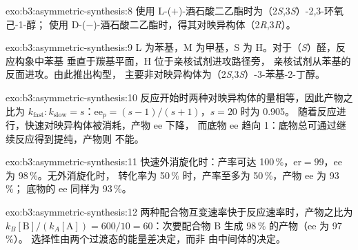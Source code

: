 \begin{solution}{exo:b3:asymmetric-synthesis:8}
使用 L-($+$)-酒石酸二乙酯时为（2\textit{S},3\textit{S}）-2,3-环氧己-1-醇；
使用 D-($-$)-酒石酸二乙酯时，得其对映异构体（2\textit{R},3\textit{R}）。
\end{solution}

\begin{solution}{exo:b3:asymmetric-synthesis:9}
L 为苯基，M 为甲基，S 为 H。对于（\textit{S}）醛，反应构象中苯基
垂直于羰基平面，H 位于亲核试剂进攻路径旁，
亲核试剂从苯基的反面进攻。由此推出构型，
主要非对映异构体为（2\textit{S},3\textit{S}）-3-苯基-2-丁醇。
\end{solution}

\begin{solution}{exo:b3:asymmetric-synthesis:10}
反应开始时两种对映异构体的量相等，因此产物之比为
$k_{\mathrm{fast}} : k_{\mathrm{slow}} = s$：$\mathrm{ee}_p = (s - 1)/(s + 1)$，$s = 20$ 时为 0.905。
随着反应进行，快速对映异构体被消耗，产物 ee 下降，
而底物 ee 趋向 1：底物总可通过继续反应得到提纯，产物则
不能。
\end{solution}

\begin{solution}{exo:b3:asymmetric-synthesis:11}
快速外消旋化时：产率可达 100\,\%，$\mathrm{er} = 99$，ee 为 98\,\%。无外消旋化时，
转化率为 50\,\% 时，产率至多为 50\,\%，产物 ee 为 93\,\%；
底物的 ee 同样为 93\,\%。
\end{solution}

\begin{solution}{exo:b3:asymmetric-synthesis:12}
两种配合物互变速率快于反应速率时，产物之比为
$k_B[\mathrm B]/(k_A[\mathrm A]) = 600/10 = 60$：次要配合物 B 生成 98\,\% 的产物（ee 为 97\,\%）。
选择性由两个过渡态的能量差决定，而非
由中间体的决定。
\end{solution}

